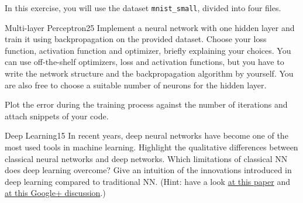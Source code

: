 \newif\ifvimbug
\vimbugfalse

\ifvimbug

\fi

In this exercise, you will use the dataset \texttt{mnist\_small}, divided into four files.

\begin{questions}


\begin{question}{Multi-layer Perceptron}{25}
Implement a neural network with one hidden layer and train it using backpropagation on the provided dataset. Choose your loss function, activation function and optimizer, briefly explaining your choices. You can use off-the-shelf optimizers, loss and activation functions, but you have to write the network structure and the backpropagation algorithm by yourself. You are also free to choose a suitable number of neurons for the hidden layer.

Plot the error during the training process against the number of iterations and attach snippets of your code. 

\begin{answer}\end{answer}

\end{question}


\begin{question}[bonus]{Deep Learning}{15}
In recent years, deep neural networks have become one of the most used tools in machine learning. 
Highlight the qualitative differences between classical neural networks and deep networks. Which limitations of classical NN does deep learning overcome?
Give an intuition of the innovations introduced in deep learning compared to traditional NN.
(Hint: have a look \href{http://arxiv.org/abs/1206.5538}{at this paper} and \href{https://plus.google.com/100849856540000067209/posts/9BDtGwCDL7D}{at this Google+ discussion}.)

\begin{answer}\end{answer}

\end{question}


\end{questions}
